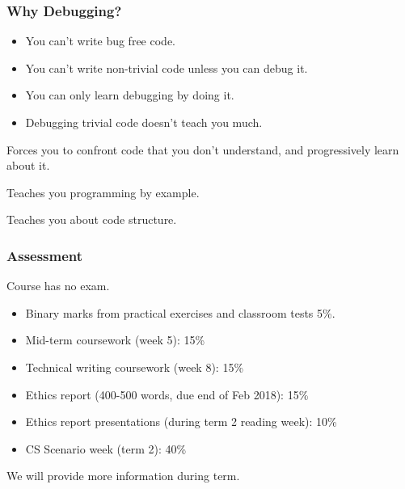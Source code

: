 \documentclass{beamer} %
\begin{document}
\begin{frame}
  \frametitle{Why Debugging?}

  \begin{itemize}
  \item You can't write bug free code.
  \item You can't write non-trivial code unless you can debug it.
  \item You can only learn debugging by doing it.
  \item Debugging trivial code doesn't teach you much.
  \end{itemize}

  Forces you to confront code that you don't understand, and
  progressively learn about it.
  \vspace{2mm}
  \begin{description}
  \item Teaches you programming by example.
  \item Teaches you about code structure.
  \end{description}
\end{frame}

\begin{frame}
  \frametitle{Assessment}

  Course has no exam.
  \begin{itemize}
    \item Binary marks from practical exercises and classroom tests 5\%.
    \item Mid-term coursework (week 5): 15\%
    \item Technical writing coursework (week 8): 15\%
    \item Ethics report (400-500 words, due end of Feb 2018): 15\%
    \item Ethics report presentations (during term 2 reading week): 10\%
    \item CS Scenario week (term 2): 40\%
  \end{itemize}

We will provide more information during term.

\end{frame}
\end{document}
